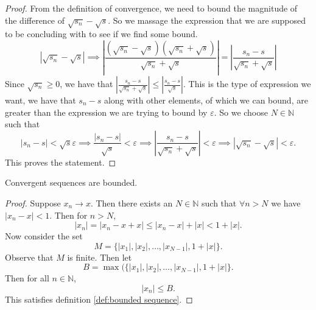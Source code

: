 \documentclass[../main.tex]{subfiles}
\begin{document}
    \begin{proof}
    From the definition of convergence, we need to bound the magnitude of the difference of \( \sqrt{s_n} - \sqrt{s} \). So we massage the expression that we are supposed to be concluding with to see if we find some bound. 
    \[
    \left| \sqrt{s_n} - \sqrt{s} \right| \implies \left| \frac{(\sqrt{s_n} - \sqrt{s})(\sqrt{s_n} + \sqrt{s})}{\sqrt{s_n} + \sqrt{s}} \right| = \left| \frac{s_n - s}{\sqrt{s_n} + \sqrt{s}} \right|
    \]
    Since \( \sqrt{s_n} \geq 0\), we have that \( \left| \frac{s_n - s}{\sqrt{s_n} + \sqrt{s}} \right| \leq \left| \frac{s_n - s}{\sqrt{s}} \right|\). This is the type of expression we want, we have that \( s_n - s\) along with other elements, of which we can bound, are greater than the expression we are trying to bound by \( \varepsilon \). So we choose \( N \in \mathbb{N}\) such that
    \[
    \mid s_n - s \mid < \sqrt{s}\varepsilon \implies \frac{|s_n - s|}{\sqrt{s}} < \varepsilon \implies \left| \frac{s_n - s}{\sqrt{s_n} + \sqrt{s}} \right| <\varepsilon \implies \left| \sqrt{s_n} - \sqrt{s} \right| < \varepsilon.
    \]
    This proves the statement.   
    \end{proof}
    
    
    
    
    
    
    
    
    
    
    
    
    
    
    
    
    
    
    \begin{proposition}\label{prp: convergent sequences are bounded}
    
    Convergent sequences are bounded.
    
    \end{proposition}
    
    
    
    
    
    \begin{proof}
    Suppose \(x_n \longrightarrow x\). Then there exists an \( N \in \mathbb{N}\) such that \(\forall n > N\) we have \(|x_n - x| < 1\). Then for \(n > N\),
    \[
    |x_n| = |x_n - x + x| \leq |x_n - x| + |x| < 1 + |x| . 
    \]
    Now consider the set 
    \[M = \{|x_1|, |x_2|, \dots, |x_{N-1}|, 1 + |x|  \}.\]
    Observe that \(M\) is finite. Then let \[B = \max(\{|x_1|, |x_2|, \dots, |x_{N-1}|, 1 + |x|  \}.\]
    Then for all \(n \in \mathbb{N}\), 
    \[|x_n| \leq B.\]
    This satisfies definition \ref{def:bounded sequence}.   
    \end{proof}
    
\end{document}
